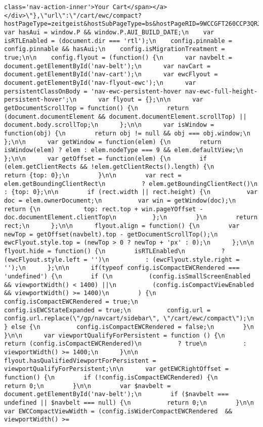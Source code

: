 \documentclass[
]{article}
\begin{document}
\begin{verbatim}
class='nav-action-inner'>Your Cart</span></a></div>\"},\"url\":\"/cart/ewc/compact?hostPageType=zeitgeist&hostSubPageType=bs&hostPageRID=9WCCGFT260CCP3QRJZAZ&prerender=0&storeName=electronics\",\"cartCount\":0,\"freshCartCount\":0,\"almCartCount\":0,\"primeWardrobeCartCount\":0,\"isCompactViewEnabled\":true,\"isCompactEWCRendered\":true,\"isWiderCompactEWCRendered\":true};\n    var hasAui = window.P && window.P.AUI_BUILD_DATE;\n    var isRTLEnabled = (document.dir === 'rtl');\n    config.pinnable = config.pinnable && hasAui;\n    config.isMigrationTreatment = true;\n\n    config.flyout = (function() {\n      var navbelt = document.getElementById('nav-belt');\n      var navCart = document.getElementById('nav-cart');\n      var ewcFlyout = document.getElementById('nav-flyout-ewc');\n      var persistentClassOnBody = 'nav-ewc-persistent-hover nav-ewc-full-height-persistent-hover';\n      var flyout = {};\n\n      var getDocumentScrollTop = function() {\n        return (document.documentElement && document.documentElement.scrollTop) || document.body.scrollTop;\n      };\n\n      var isWindow = function(obj) {\n        return obj != null && obj === obj.window;\n      };\n\n      var getWindow = function(elem) {\n        return isWindow(elem) ? elem : elem.nodeType === 9 && elem.defaultView;\n      };\n\n      var getOffset = function(elem) {\n        if (elem.getClientRects && !elem.getClientRects().length) {\n          return {top: 0};\n        }\n\n        var rect = elem.getBoundingClientRect\n          ? elem.getBoundingClientRect()\n          : {top: 0};\n\n        if (rect.width || rect.height) {\n          var doc = elem.ownerDocument;\n          var win = getWindow(doc);\n          return {\n            top: rect.top + win.pageYOffset - doc.documentElement.clientTop\n          };\n        }\n        return rect;\n      };\n\n      flyout.align = function() {\n        var newTop = getOffset(navbelt).top - getDocumentScrollTop();\n        ewcFlyout.style.top = (newTop > 0 ? newTop + 'px' : 0);\n      };\n\n      flyout.hide = function() {\n        isRTLEnabled\n          ? (ewcFlyout.style.left = '')\n          : (ewcFlyout.style.right = '');\n      };\n\n      if(typeof config.isCompactEWCRendered === 'undefined') {\n        if (\n          (config.isSmallScreenEnabled && viewportWidth() < 1400) ||\n          (config.isCompactViewEnabled && viewportWidth() >= 1400)\n        ) {\n          config.isCompactEWCRendered = true;\n          config.isEWCStateExpanded = true;\n          config.url = config.url.replace(\"/gp/navcart/sidebar\", \"/cart/ewc/compact\");\n        } else {\n          config.isCompactEWCRendered = false;\n        }\n      }\n\n      var viewportQualifyForPersistent = function () {\n        return (config.isCompactEWCRendered)\n          ? true\n          : viewportWidth() >= 1400;\n      }\n\n      flyout.hasQualifiedViewportForPersistent = viewportQualifyForPersistent;\n\n      var getEWCRightOffset = function() {\n        if (!config.isCompactEWCRendered) {\n          return 0;\n        }\n\n        var $navbelt = document.getElementById('nav-belt');\n        if ($navbelt === undefined || $navbelt === null) {\n          return 0;\n        }\n\n        var EWCCompactViewWidth = (config.isWiderCompactEWCRendered  && viewportWidth() >= 
\end{verbatim}
\end{document}
